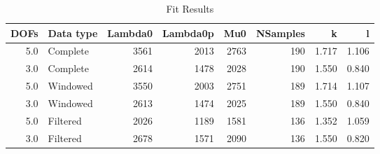 \begin{table}
\centering
\caption{Fit Results}
\begin{tabular}{rlrrrrrr}
\toprule
 DOFs & Data type &  Lambda0 &  Lambda0p &   Mu0 &  NSamples &      k &      l \\
\midrule
  5.0 &  Complete &     3561 &      2013 &  2763 &       190 &  1.717 &  1.106 \\
  3.0 &  Complete &     2614 &      1478 &  2028 &       190 &  1.550 &  0.840 \\
  5.0 &  Windowed &     3550 &      2003 &  2751 &       189 &  1.714 &  1.107 \\
  3.0 &  Windowed &     2613 &      1474 &  2025 &       189 &  1.550 &  0.840 \\
  5.0 &  Filtered &     2026 &      1189 &  1581 &       136 &  1.352 &  1.059 \\
  3.0 &  Filtered &     2678 &      1571 &  2090 &       136 &  1.550 &  0.820 \\
\bottomrule
\end{tabular}
\end{table}
